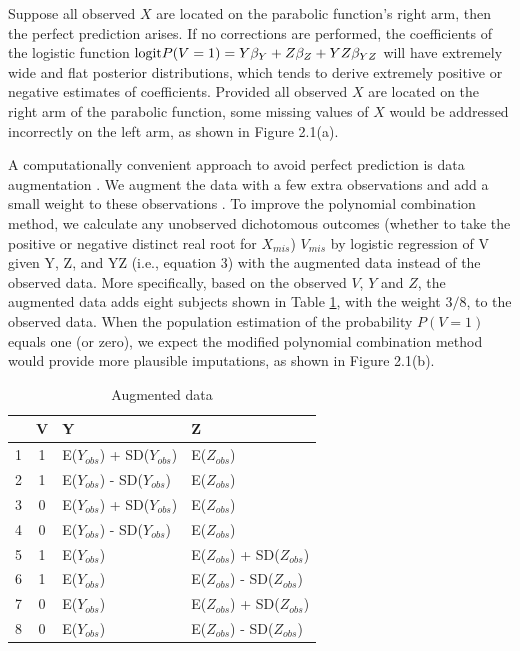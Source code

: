 	Suppose all observed $ X $ are located on the parabolic function's right arm, then the perfect prediction arises. If no corrections are performed, the coefficients of the logistic function $\textnormal{logit}P(V = 1) = Y\beta_{Y} + Z\beta_{Z} + YZ\beta_{YZ}$ will have extremely wide and flat posterior distributions, which tends to derive extremely positive or negative estimates of coefficients. Provided all observed $X$ are located on the right arm of the parabolic function, some missing values of $X$ would be addressed incorrectly on the left arm, as shown in Figure 2.1(a).
	
	A computationally convenient approach to avoid perfect prediction is data augmentation \citep[Section 3.6.2]{Buuren2018}. We augment the data with a few extra observations and add a small weight to these observations \citep[Section 5.2]{white2010avoiding}. To improve the polynomial combination method, we calculate any unobserved dichotomous outcomes (whether to take the positive or negative distinct real root for $X_{mis}$) $V_{mis}$ by logistic regression of V given Y, Z, and YZ (i.e., equation 3) with the augmented data instead of the observed data. More specifically, based on the observed $V$, $Y$ and $Z$, the augmented data adds eight subjects shown in Table \ref{tab2_2}, with the weight $3/8$, to the observed data. When the population estimation of the probability $P(V = 1)$ equals one (or zero), we expect the modified polynomial combination method would provide more plausible imputations, as shown in Figure 2.1(b). 
	
	\begin{table}[ht!]
		\centering
		\begin{tabular}{c|c|l|l}
			& V & Y                              & Z                              \\\hline
			1 & 1 & E($Y_{obs}$) + SD($Y_{obs}$) & E($Z_{obs}$)                  \\
			2 & 1 & E($Y_{obs}$) - SD($Y_{obs}$) & E($Z_{obs}$)                  \\
			3 & 0 & E($Y_{obs}$) + SD($Y_{obs}$) & E($Z_{obs}$)                  \\
			4 & 0 & E($Y_{obs}$) - SD($Y_{obs}$) & E($Z_{obs}$)                  \\
			5 & 1 & E($Y_{obs}$)                  & E($Z_{obs}$) + SD($Z_{obs}$) \\
			6 & 1 & E($Y_{obs}$)                  & E($Z_{obs}$) - SD($Z_{obs}$) \\
			7 & 0 & E($Y_{obs}$)                  & E($Z_{obs}$) + SD($Z_{obs}$) \\
			8 & 0 & E($Y_{obs}$)                  & E($Z_{obs}$) - SD($Z_{obs}$)
		\end{tabular}
		\caption{Augmented data}
		\label{tab2_2}
	\end{table}
	
